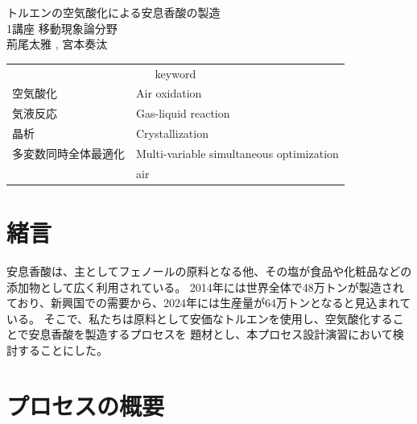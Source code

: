 \documentclass[a4j]{jsreport}
\begin{document}
\begin{titlepage}
\vspace{5cm}
\centering
{\Huge トルエンの空気酸化による安息香酸の製造}\\
\vspace{2cm}
\centering
{\Large 1講座 移動現象論分野}\\
\vspace{0.5cm}
\centering
{\large 荊尾太雅 , 宮本奏汰}\\
\vspace{3cm}
\begin{table}[htbp]
    \begin{center}
        \begin{tabular}[htbp]{ll}
            \multicolumn{2}{c}{{\LARGE keyword}}\\
            {\Large 空気酸化}&{\Large Air oxidation}\\
            {\Large 気液反応}&{\Large Gas-liquid reaction}\\
            {\Large 晶析}&{\Large Crystallization}\\
            {\Large 多変数同時全体最適化}&{\Large Multi-variable simultaneous optimization}\\
            {\Large }&{\Large air}\\
        \end{tabular}
    \end{center}
\end{table}

\end{titlepage}


\newpage
{}
\setcounter{tocdepth}{2}
\tableofcontents
    
\newpage

\chapter{緒言}
安息香酸は、主としてフェノールの原料となる他、その塩が食品や化粧品などの添加物として広く利用されている。
2014年には世界全体で48万トンが製造されており、新興国での需要から、2024年には生産量が64万トンとなると見込まれている。
そこで、私たちは原料として安価なトルエンを使用し、空気酸化することで安息香酸を製造するプロセスを
題材とし、本プロセス設計演習において検討することにした。

\newpage
\chapter{プロセスの概要}
\end{document}
